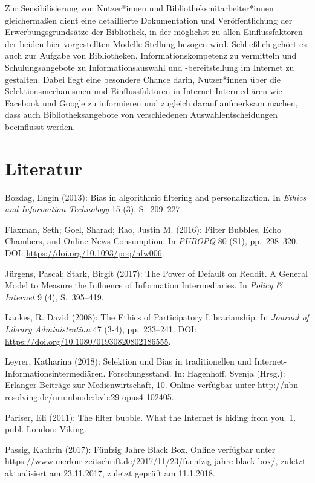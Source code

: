 \documentclass[a4paper,
fontsize=11pt,
oneside,
numbers=noperiodatend,
parskip=half-,
bibliography=totoc,
final
]{scrartcl}
\begin{document}
Zur Sensibilisierung von Nutzer*innen und Bibliotheksmitarbeiter*innen
gleichermaßen dient eine detaillierte Dokumentation und Veröffentlichung
der Erwerbungsgrundsätze der Bibliothek, in der möglichst zu allen
Einflussfaktoren der beiden hier vorgestellten Modelle Stellung bezogen
wird. Schließlich gehört es auch zur Aufgabe von Bibliotheken,
Informationskompetenz zu vermitteln und Schulungsangebote zu
Informationsauswahl und -bereitstellung im Internet zu gestalten. Dabei
liegt eine besondere Chance darin, Nutzer*innen über die
Selektionsmechanismen und Einflussfaktoren in Internet-Intermediären wie
Facebook und Google zu informieren und zugleich darauf aufmerksam
machen, dass auch Bibliotheksangebote von verschiedenen
Auswahlentscheidungen beeinflusst werden.

\hypertarget{literatur}{%
\section{Literatur}\label{literatur}}

Bozdag, Engin (2013): Bias in algorithmic filtering and personalization.
In \emph{Ethics and Information Technology} 15 (3), S.~209--227.

Flaxman, Seth; Goel, Sharad; Rao, Justin M. (2016): Filter Bubbles, Echo
Chambers, and Online News Consumption. In \emph{PUBOPQ} 80 (S1),
pp.~298--320. DOI: \url{https://doi.org/10.1093/poq/nfw006}.

Jürgens, Pascal; Stark, Birgit (2017): The Power of Default on Reddit. A
General Model to Measure the Influence of Information Intermediaries. In
\emph{Policy \& Internet} 9 (4), S.~395--419.

Lankes, R. David (2008): The Ethics of Participatory Librarianship. In
\emph{Journal of Library Administration} 47 (3-4), pp.~233--241. DOI:
\url{https://doi.org/10.1080/01930820802186555}.

Leyrer, Katharina (2018): Selektion und Bias in traditionellen und
Internet-Informations\-in\-ter\-me\-di\-ären. Forschungsstand. In: Hagenhoff,
Svenja (Hrsg.): Erlanger Beiträge zur Medienwirtschaft, 10. Online
verfügbar unter
\url{http://nbn-resolving.de/urn:nbn:de:bvb:29-opus4-102405}.

Pariser, Eli (2011): The filter bubble. What the Internet is hiding from
you. 1. publ. London: Viking.

Passig, Kathrin (2017): Fünfzig Jahre Black Box. Online verfügbar unter
\url{https://www.merkur-zeitschrift.de/2017/11/23/fuenfzig-jahre-black-box/},
zuletzt aktualisiert am 23.11.2017, zuletzt geprüft am 11.1.2018.
\end{document}
